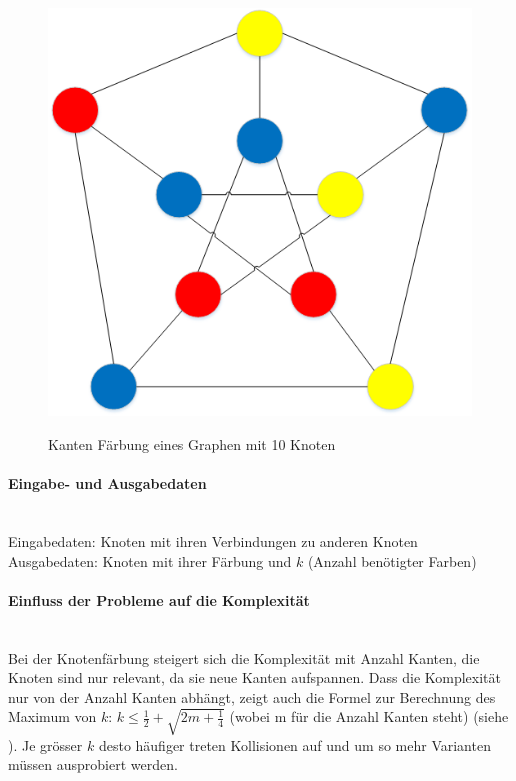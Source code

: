 \begin{figure}[ht]
{  \includegraphics[scale=0.5]{images/visio/graph_faerbung_correct.png}
  \label{fig:graph_faerbung_correct}
}
\caption[Kanten Färbung eines Graphen mit 10 Knoten]{Kanten Färbung eines Graphen mit 10 Knoten \selfmade{}}
\label{fig:graph_faerbung}
\end{figure}

\FloatBarrier 
	\paragraph{Eingabe- und Ausgabedaten}\mbox{}\\
	Eingabedaten: Knoten mit ihren Verbindungen zu anderen Knoten\\
	Ausgabedaten: Knoten mit ihrer Färbung und $k$ (Anzahl benötigter Farben)

	\paragraph{Einfluss der Probleme auf die Komplexität}\mbox{}\\
	Bei der Knotenfärbung steigert sich die Komplexität mit Anzahl Kanten, die Knoten sind nur relevant, da sie neue Kanten aufspannen. Dass die Komplexität nur von der Anzahl Kanten 
	abhängt, zeigt auch die Formel zur Berechnung des Maximum von $k$: $k \le \frac{1}{2} + \sqrt{2m + \frac{1}{4}}$ (wobei m für die Anzahl Kanten steht) 
	(siehe \cite{seminar_rainer_graph}). Je grösser $k$ desto häufiger treten Kollisionen auf und um so mehr Varianten müssen ausprobiert werden.

